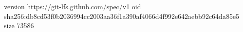 version https://git-lfs.github.com/spec/v1
oid sha256:db8cd53f0b2036994cc2003aa36f1a390af4066d4f992e642aebb92c64da85e5
size 73586
